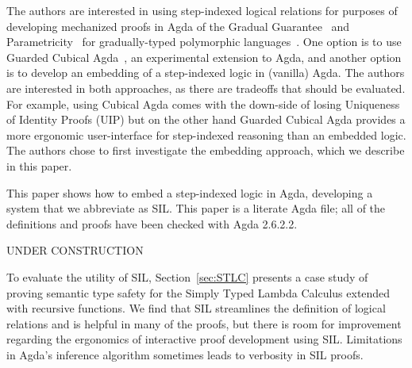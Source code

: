 \documentclass[acmsmall]{acmart}
\newcommand{\app}{\,}
\begin{document}
The authors are interested in using step-indexed logical relations for
purposes of developing mechanized proofs in Agda of the Gradual
Guarantee~\citep{Siek:2015ac} and Parametricity~\citep{REYNOLDS74C}
for gradually-typed polymorphic
languages~\citep{Ahmed:2011fk,Ahmed:2017aa,Igarashi:2017aa,New:2019ab,Labrada:2020tk}.
One option is to use Guarded Cubical Agda~\citep{Veltri:2020aa}, an
experimental extension to Agda, and another option is to develop an
embedding of a step-indexed logic in (vanilla) Agda. The authors are
interested in both approaches, as there are tradeoffs that should be
evaluated. For example, using Cubical Agda comes with the down-side of
losing Uniqueness of Identity Proofs (UIP) but on the other hand
Guarded Cubical Agda provides a more ergonomic user-interface for
step-indexed reasoning than an embedded logic. The authors chose to
first investigate the embedding approach, which we describe in this
paper.

This paper shows how to embed a step-indexed logic in Agda, developing
a system that we abbreviate as SIL. This paper is a literate Agda
file; all of the definitions and proofs have been checked with Agda
2.6.2.2.



UNDER CONSTRUCTION

To evaluate the utility of SIL, Section~\ref{sec:STLC} presents a case
study of proving semantic type safety for the Simply Typed Lambda
Calculus extended with recursive functions. We find that SIL
streamlines the definition of logical relations and is helpful in many
of the proofs, but there is room for improvement regarding the
ergonomics of interactive proof development using SIL.  Limitations in
Agda's inference algorithm sometimes leads to verbosity in SIL proofs.










\end{document}
